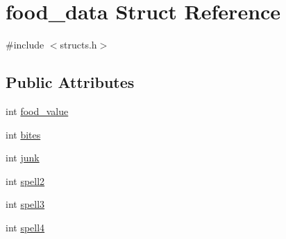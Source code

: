 \hypertarget{structfood__data}{\section{food\-\_\-data Struct Reference}
\label{structfood__data}
}


{\ttfamily \#include $<$structs.\-h$>$}

\subsection*{Public Attributes}
\begin{DoxyCompactItemize}
\item 
int \hyperlink{structfood__data_aee57d73b40a6d430c9d3f57cede2b24f}{food\-\_\-value}
\item 
int \hyperlink{structfood__data_a669ba701301395c18b9a3fa1d91bd731}{bites}
\item 
int \hyperlink{structfood__data_a03968a2d2e00be0a73e3dee094b0daf6}{junk}
\item 
int \hyperlink{structfood__data_a6cff52d0911c9d4c3e657019eebfd5e6}{spell2}
\item 
int \hyperlink{structfood__data_a012498bdbd43d58c2fddd522e4bfd9c5}{spell3}
\item 
int \hyperlink{structfood__data_af2d5608e4c68d2531ec342f891c1041b}{spell4}
\end{DoxyCompactItemize}


